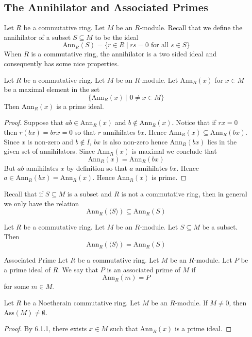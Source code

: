 \documentclass[a4paper]{article}
\begin{document}
\subsection{The Annihilator and Associated Primes}
Let $R$ be a commutative ring. Let $M$ be an $R$-module. Recall that we define the annihilator of a subset $S\subseteq M$ to be the ideal $$\text{Ann}_R(S)=\{r\in R\;|\;rs=0\text{ for all }s\in S\}$$ When $R$ is a commutative ring, the annihilator is a two sided ideal and consequently has some nice properties. 

\begin{prp}{}{} Let $R$ be a commutative ring. Let $M$ be an $R$-module. Let $\text{Ann}_R(x)$ for $x\in M$ be a maximal element in the set $$\{\text{Ann}_R(x)\;|\;0\neq x\in M\}$$ Then $\text{Ann}_R(x)$ is a prime ideal. 
\begin{proof}
Suppose that $ab\in\text{Ann}_R(x)$ and $b\notin\text{Ann}_R(x)$. Notice that if $rx=0$ then $r(bx)=brx=0$ so that $r$ annihilates $bx$. Hence $\text{Ann}_R(x)\subseteq\text{Ann}_R(bx)$. Since $x$ is non-zero and $b\notin I$, $bx$ is also non-zero hence $\text{Ann}_R(bx)$ lies in the given set of annihilators. Since $\text{Ann}_R(x)$ is maximal we conclude that $$\text{Ann}_R(x)=\text{Ann}_R(bx)$$ But $ab$ annihilates $x$ by definition so that $a$ annihilates $bx$. Hence $a\in\text{Ann}_R(bx)=\text{Ann}_R(x)$. Hence $\text{Ann}_R(x)$ is prime. 
\end{proof}
\end{prp}

Recall that if $S\subseteq M$ is a subset and $R$ is not a commutative ring, then in general we only have the relation $$\text{Ann}_R(\langle S\rangle)\subseteq\text{Ann}_R(S)$$

\begin{prp}{}{} Let $R$ be a commutative ring. Let $M$ be an $R$-module. Let $S\subseteq M$ be a subset. Then $$\text{Ann}_R(\langle S\rangle)=\text{Ann}_R(S)$$
\end{prp}

\begin{defn}{Associated Prime}{} Let $R$ be a commutative ring. Let $M$ be an $R$-module. Let $P$ be a prime ideal of $R$. We say that $P$ is an associated prime of $M$ if $$\text{Ann}_R(m)=P$$ for some $m\in M$. 
\end{defn}

\begin{lmm}{}{} Let $R$ be a Noetherain commutative ring. Let $M$ be an $R$-module. If $M\neq 0$, then $\text{Ass}(M)\neq\emptyset$. 
\begin{proof}
By 6.1.1, there exists $x\in M$ such that $\text{Ann}_R(x)$ is a prime ideal. 
\end{proof}
\end{lmm}
\end{document}
